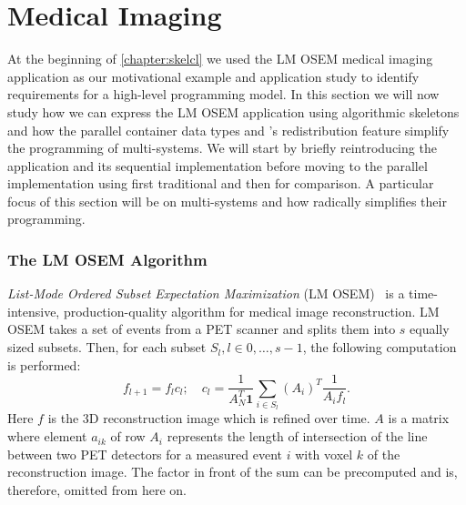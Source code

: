 \section{Medical Imaging}
\label{section:medical-imaging}
At the beginning of \autoref{chapter:skelcl} we used the LM OSEM medical imaging application as our motivational example and application study to identify requirements for a high-level programming model.
In this section we will now study how we can express the LM OSEM application using algorithmic skeletons and how the parallel container data types and \SkelCL's redistribution feature simplify the programming of multi-\GPU systems.
We will start by briefly reintroducing the application and its sequential implementation before moving to the parallel implementation using first traditional \OpenCL and then \SkelCL for comparison.
A particular focus of this section will be on multi-\GPU systems and how \SkelCL radically simplifies their programming.

\subsubsection*{The LM OSEM Algorithm}
\emph{List-Mode Ordered Subset Expectation Maximization} (LM OSEM)~\cite{ReaderErFlOt1998, SchellmannGoMeKoScWuBu2009} is a time-intensive, production-quality algorithm for medical image reconstruction.
LM OSEM takes a set of events from a PET scanner and splits them into $s$ equally sized subsets.
Then, for each subset $S_l, l \in {0, \ldots, s-1}$, the following computation is performed:
\begin{equation}
 f_{l+1}=f_{l}c_{l};\quad
 c_{l}=\dfrac{1}{A_N^T \textbf{1}}
\sum_{i \in S_{l}} (A_i)^T \dfrac{1}{A_{i} f_{l}}.
\label{eq:lm_osem2}
\end{equation}
Here $f$ is the 3D reconstruction image which is refined over time.
$A$ is a matrix where element $a_{ik}$ of row $A_i$ represents the length of intersection of the line between two PET detectors for a measured event $i$ with voxel $k$ of the reconstruction image.
The factor in front of the sum can be precomputed and is, therefore, omitted from here on.

